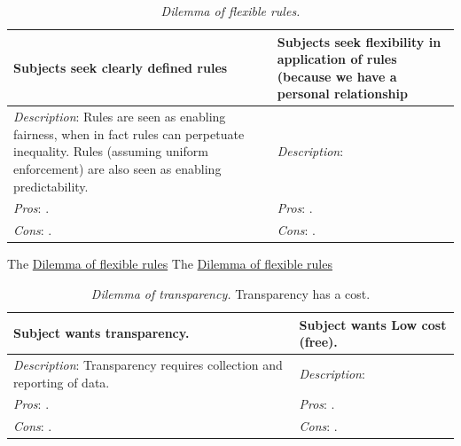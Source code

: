\begin{center}
\begin{table}[H] %
\begin{tabular}{ | m{\dilemmatablewidth}| m{\dilemmatablewidth} | } 
  \hline
  \textbf{Subjects seek clearly defined rules} &
  \textbf{Subjects seek flexibility in application of rules (because we have a personal relationship} \\
  \hline
  \textit{Description}: Rules are seen as enabling fairness, when in fact rules can perpetuate inequality. Rules (assuming uniform enforcement) are also seen as enabling predictability. & 
  \textit{Description}:  \\
  \hline
  \textit{Pros}: . & 
  \textit{Pros}: . \\
  \hline
  \textit{Cons}: . & 
  \textit{Cons}: . \\
  \hline
\end{tabular}
\caption{\textit{Dilemma of flexible rules.}
}
\label{table:dilemma-flexiblity}
\end{table}
\end{center}


The \href{table:dilemma-flexiblity}{Dilemma of flexible rules}
The \href{table:dilemma-flexiblity}{Dilemma of flexible rules}


\begin{center}
\begin{table}[H] %
\begin{tabular}{ | m{\dilemmatablewidth}| m{\dilemmatablewidth} | } 
  \hline
  \textbf{Subject wants transparency.} &
  \textbf{Subject wants Low cost (free).} \\
  \hline
  \textit{Description}: Transparency requires collection and reporting of data. & 
  \textit{Description}:  \\
  \hline
  \textit{Pros}: . & 
  \textit{Pros}: . \\
  \hline
  \textit{Cons}: . & 
  \textit{Cons}: . \\
  \hline
\end{tabular}
\caption{\textit{Dilemma of transparency.}
Transparency has a cost.
}
\label{table:dilemma-transparency}
\end{table}
\end{center}


